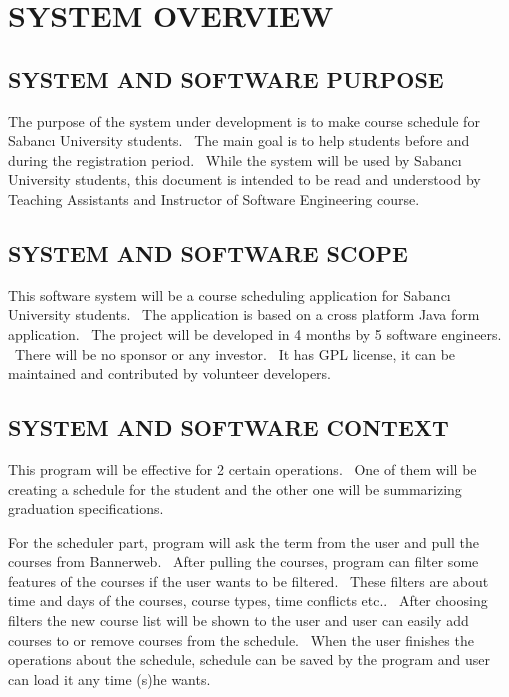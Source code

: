 \documentclass[twoside,letterpaper]{article}
\begin{document}
\clearpage\pagestyle{Standard}
\section{SYSTEM OVERVIEW}
\label{sec:overview}

\subsection{SYSTEM AND SOFTWARE PURPOSE}

The purpose of the system under development is to make course schedule for Sabanc\i{} University students. \ The main goal is to help students before and during the registration period. \ While the system will be used by Sabanc{\i} University students,
this document is intended to be read and understood by Teaching Assistants and Instructor of Software Engineering course.

\subsection{SYSTEM AND SOFTWARE SCOPE}

This software system will be a course scheduling application for Sabanc\i{} University students. \ The application is based on a cross platform Java form application. \ The project will be developed in 4 months by 5 software engineers. \ There will be no sponsor or any investor. \ It has GPL license, it can be maintained and contributed by volunteer developers.

\subsection{SYSTEM AND SOFTWARE CONTEXT}

This program will be effective for 2 certain operations. \ One of them will be creating a schedule for the student and the other one will be summarizing graduation specifications.
\bigskip

\noindent
For the scheduler part, program will ask the term from the user and pull the courses from Bannerweb. \ After pulling the courses, program can filter some features of the courses if the user wants to be filtered. \ These filters are about time and days of the courses, course types, time conflicts etc.. \ After choosing filters the new course list will be shown to the user and user can easily add courses to or remove courses from the schedule. \ When the user finishes the operations about the schedule, schedule can be saved by the program and user can load it any time (s)he wants.
\bigskip
\end{document}
